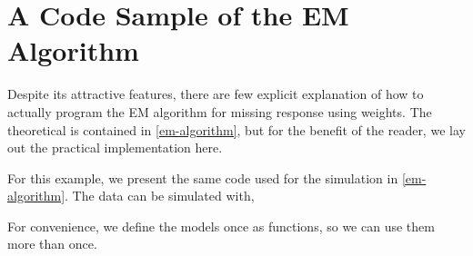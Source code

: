 \documentclass[12pt,twoside]{reedthesis}
\begin{document}
  \appendix
  
  \chapter{A Code Sample of the EM Algorithm}\label{em-implementation}
  
  Despite its attractive features, there are few explicit explanation of
  how to actually program the EM algorithm for missing response using
  weights. The theoretical is contained in \autoref{em-algorithm}, but for
  the benefit of the reader, we lay out the practical implementation here.
  
  For this example, we present the same code used for the simulation in
  \autoref{em-algorithm}. The data can be simulated with,
  
  \begin{Shaded}
  \begin{Highlighting}[]
  \StringTok{ } \NormalTok{/}\StringTok{ }\NormalTok{(} \NormalTok{+}\StringTok{ }
  \StringTok{ }
  \StringTok{ }\NormalTok{, }\NormalTok{)}
  \StringTok{ }\NormalTok{, } \NormalTok{(} \NormalTok{*}\StringTok{ }
  \StringTok{ }\NormalTok{, } \NormalTok{(} \NormalTok{+}\StringTok{ } \NormalTok{*}\StringTok{ }
  
  \StringTok{ }
  \StringTok{ }\StringTok{ }\NormalTok{, }
  \end{Highlighting}
  \end{Shaded}
  
  For convenience, we define the models once as functions, so we can use
  them more than once.
  
  \begin{Shaded}
  \begin{Highlighting}[]
  \StringTok{ } \NormalTok{) \{}
    \StringTok{ }\StringTok{ }   
  \NormalTok{\}}
  \StringTok{ } \NormalTok{) \{}
    \StringTok{ }   
  \NormalTok{\}}
  \end{Highlighting}
  \end{Shaded}
  
\end{document}
